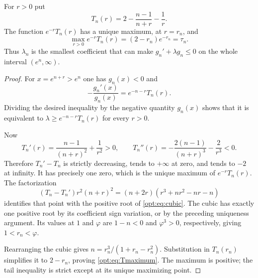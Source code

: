 \begin{lemma}\label{opt:lem:tail}
For $r>0$ put
\[
 T_n(r)=2-\frac{n-1}{n+r}-\frac1r.
\]
The function $e^{-r}T_n(r)$ has a unique maximum, at $r=r_n$, and
\begin{equation}\label{opt:eq:Tmaximum}
 \max_{r>0}e^{-r}T_n(r)=(2-r_n)e^{-r_n}=\tau_n.
\end{equation}
Thus $\lambda_n$ is the smallest coefficient that can make
$g_n'+\lambda g_n\leq0$ on the whole interval $(e^n,\infty)$.
\end{lemma}
\begin{proof}
For $x=e^{n+r}>e^n$ one has $g_n(x)<0$ and
\[
 -\frac{g_n'(x)}{g_n(x)}=e^{-n-r}T_n(r).
\]
Dividing the desired inequality by the negative quantity $g_n(x)$
shows that it is equivalent to
$\lambda\geq e^{-n-r}T_n(r)$ for every $r>0$.

Now
\[
 T_n'(r)=\frac{n-1}{(n+r)^2}+\frac1{r^2}>0,
 \qquad
 T_n''(r)=-\frac{2(n-1)}{(n+r)^3}-\frac2{r^3}<0.
\]
Therefore $T_n'-T_n$ is strictly decreasing, tends to $+\infty$
at zero, and tends to $-2$ at infinity. It has precisely one zero,
which is the unique maximum of $e^{-r}T_n(r)$. The factorization
\begin{equation}\label{opt:eq:factor}
 (T_n-T_n')r^2(n+r)^2
 =(n+2r)(r^3+nr^2-nr-n)
\end{equation}
identifies that point with the positive root of \eqref{opt:eq:cubic}.
The cubic has exactly one positive root by its coefficient sign
variation, or by the preceding uniqueness argument. Its values at $1$
and $\varphi$ are $1-n<0$ and $\varphi^3>0$, respectively, giving
$1<r_n<\varphi$.

Rearranging the cubic gives
$n=r_n^3/(1+r_n-r_n^2)$. Substitution in $T_n(r_n)$ simplifies it
to $2-r_n$, proving \eqref{opt:eq:Tmaximum}. The maximum is positive;
the tail inequality is strict except at its unique maximizing point.
\end{proof}

